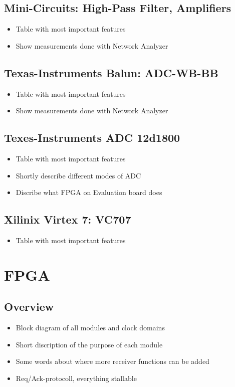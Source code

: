 \subsection{Mini-Circuits: High-Pass Filter, Amplifiers}
\begin{itemize}
\item Table with most important features
\item Show measurements done with Network Analyzer
\end{itemize}

\subsection{Texas-Instruments Balun: ADC-WB-BB}
\begin{itemize}
\item Table with most important features
\item Show measurements done with Network Analyzer
\end{itemize}

\subsection{Texes-Instruments ADC 12d1800}
\begin{itemize}
\item Table with most important features
\item Shortly describe different modes of ADC
\item Discribe what FPGA on Evaluation board does
\end{itemize}

\subsection{Xilinix Virtex 7: VC707}
\begin{itemize}
\item Table with most important features
\end{itemize}

\section{FPGA}
\subsection{Overview}
\begin{itemize}
\item Block diagram of all modules and clock domains
\item Short discription of the purpose of each module
\item Some words about where more receiver functions can be added
\item Req/Ack-protocoll, everything stallable
\end{itemize}

